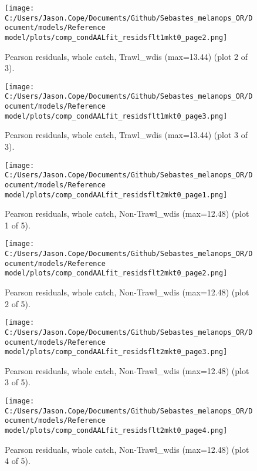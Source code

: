 \documentclass[11pt,
  english,
  letterpaper,
]{article}
\begin{document}
\begin{figure}
\centering
\texttt{[image: C:/Users/Jason.Cope/Documents/Github/Sebastes\_melanops\_OR/Document/models/Reference model/plots/comp\_condAALfit\_residsflt1mkt0\_page2.png]}
\caption{Pearson residuals, whole catch, Trawl\_wdis (max=13.44) (plot 2 of 3).\label{fig:comp_condAALfit_residsflt1mkt0_page2}}
\end{figure}

\begin{figure}
\centering
\texttt{[image: C:/Users/Jason.Cope/Documents/Github/Sebastes\_melanops\_OR/Document/models/Reference model/plots/comp\_condAALfit\_residsflt1mkt0\_page3.png]}
\caption{Pearson residuals, whole catch, Trawl\_wdis (max=13.44) (plot 3 of 3).\label{fig:comp_condAALfit_residsflt1mkt0_page3}}
\end{figure}

\begin{figure}
\centering
\texttt{[image: C:/Users/Jason.Cope/Documents/Github/Sebastes\_melanops\_OR/Document/models/Reference model/plots/comp\_condAALfit\_residsflt2mkt0\_page1.png]}
\caption{Pearson residuals, whole catch, Non-Trawl\_wdis (max=12.48) (plot 1 of 5).\label{fig:comp_condAALfit_residsflt2mkt0_page1}}
\end{figure}

\begin{figure}
\centering
\texttt{[image: C:/Users/Jason.Cope/Documents/Github/Sebastes\_melanops\_OR/Document/models/Reference model/plots/comp\_condAALfit\_residsflt2mkt0\_page2.png]}
\caption{Pearson residuals, whole catch, Non-Trawl\_wdis (max=12.48) (plot 2 of 5).\label{fig:comp_condAALfit_residsflt2mkt0_page2}}
\end{figure}

\begin{figure}
\centering
\texttt{[image: C:/Users/Jason.Cope/Documents/Github/Sebastes\_melanops\_OR/Document/models/Reference model/plots/comp\_condAALfit\_residsflt2mkt0\_page3.png]}
\caption{Pearson residuals, whole catch, Non-Trawl\_wdis (max=12.48) (plot 3 of 5).\label{fig:comp_condAALfit_residsflt2mkt0_page3}}
\end{figure}

\begin{figure}
\centering
\texttt{[image: C:/Users/Jason.Cope/Documents/Github/Sebastes\_melanops\_OR/Document/models/Reference model/plots/comp\_condAALfit\_residsflt2mkt0\_page4.png]}
\caption{Pearson residuals, whole catch, Non-Trawl\_wdis (max=12.48) (plot 4 of 5).\label{fig:comp_condAALfit_residsflt2mkt0_page4}}
\end{figure}
\end{document}
